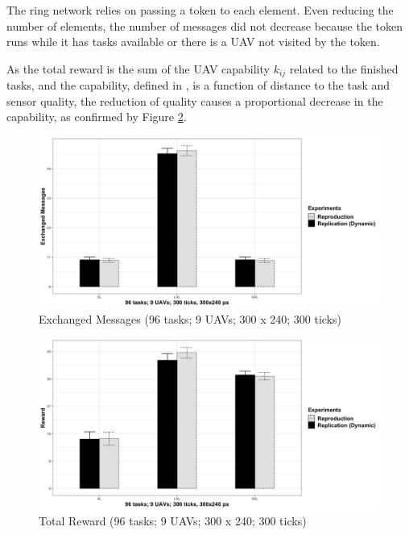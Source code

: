 The ring network relies on passing a token to each element. Even reducing the number of elements, the number of messages did not decrease because the token runs while it has tasks available or there is a UAV not visited by the token.

As the total reward is the sum of the UAV capability $k_{ij}$ related to the finished tasks, and the capability, defined in \citep{MAS07}, is a function of distance to the task and sensor quality, the reduction of quality causes a proportional decrease in the capability, as confirmed by Figure \ref{fig:fig02}.

\begin{figure}[h!]
	\begin{center}
		\includegraphics[scale=0.15]{fig/GRAPH03.png}
		\caption{Exchanged Messages  (96 tasks; 9 UAVs; 300 x 240; 300 ticks)}
		\label{fig:fig01}
	\end{center}
\end{figure}

\begin{figure}[h!]
	\begin{center}
		\includegraphics[scale=0.15]{fig/GRAPH04.png}
		\caption{Total Reward (96 tasks; 9 UAVs; 300 x 240; 300 ticks)}
		\label{fig:fig02}
	\end{center}
\end{figure}

